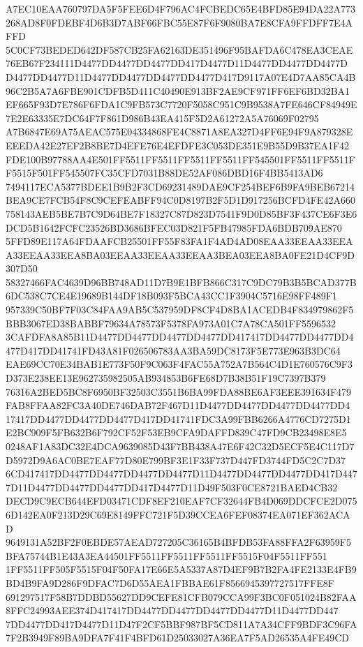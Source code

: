\documentclass[UTF8,fontset=fandol,zihao=-4,a4paper]{ctexart}
\begin{document}
{{A7EC10EAA760797DA5F5FEE6D4F796AC4FCBEDC65E4BFD85E94DA22A773268AD8F0FDEBF4D6B3D7ABF66FBC55E87F6F9080BA7E8CFA9FFDFF7E4AFFD
5C0CF73BEDED642DF587CB25FA62163DE351496F95BAFDA6C478EA3CEAE76EB67F234111D4477DD4477DD4477DD417D4477D11D4477DD4477DD4477D
D4477DD4477D11D4477DD4477DD4477DD4477D417D9117A07E4D7AA85CA4B96C2B5A7A6FBE901CDFB5D411C40490E913BF2AE9CF971FF6EF6BD32BA1
EF665F93D7E786F6FDA1C9FB573C7720F5058C951C9B9538A7FE646CF84949E7E2E63335E7DC64F7F861D986B43EA415F5D2A61272A5A76069F02795
A7B6847E69A75AEAC575E04334868FE4C8871A8EA327D4FF6E94F9A879328EEEEDA42E27EF2B8BE7D4EFE76E4EFDFE3C053DE351E9B55D9B37EA1F42
FDE100B97788AA4E501FF5511FF5511FF5511FF5511FF545501FF5511FF5511FF5515F501FF545507FC35CFD7031B88DE52AF086DBD16F4BB5413AD6
7494117ECA5377BDEE1B9B2F3CD69231489DAE9CF254BEF6B9FA9BEB67214BEA9CE7FCB54F8C9CEFEABFF94C0D8197B2F5D1D917256BCFD4FE42A660
758143AEB5BE7B7C9D64BE7F18327C87D823D7541F9D0D85BF3F437CE6F3E6DCD5B1642FCFC23526BD3686BFEC03D821F5FB47985FDA6BDB709AE870
5FFD89E117A64FDAAFCB25501FF55F83FA1F4AD4AD08EAA33EEAA33EEAA33EEAA33EEA8BA03EEAA33EEAA33EEAA3BEA03EEA8BA0FE21D4CF9D307D50
58327466FAC4639D96BB748AD11D7B9E1BFB866C317C9DC79B3B5BCAD377B6DC538C7CE4E19689B144DF18B093F5BCA43CC1F3904C5716E98FF489F1
957339C50BF7F03C84FAA9AB5C537959DF8CF4D8BA1ACEDB4F834979862F5BBB3067ED38BABBF79634A78573F5378FA973A01C7A78CA501FF5596532
3CAFDFA8A85B11D4477DD4477DD4477DD4477DD417417DD4477DD4477DD4477D417DD41741FD43A81F026506783AA3BA59DC8173F5E773E963B3DC64
EAE69CC70E34BAB1E773F50F9C063F4FAC55A752A7B564C4D1E760576C9F3D373E238EE13E962735982505AB934853B6FE68D7B38B51F19C7397B379
76316A2BED5BC8F6950BF32503C3551B6BA99FDA88BE6AF3EEE391634F479FAB8FFAA82FC3A40DE746DAB72F467D11D4477DD4477DD4477DD4477DD4
17417DD4477DD4477DD4477D417DD41741FDC3A99FBB6266A4776CD7275D1E2BC909F5FB632B6F792CF52F53EB9CFA9DAFFD839C47FD9CB23498E8E5
0248AF1A83DC32E4DCA9639085D43F7BB438A47E6F42C32D5ECF5E4C117D7D5972D9A6AC0BE7EAF77D80E799BF3E1F33F737D447FD3744FD5C2C7D37
6CD417417DD4477DD4477DD4477DD4477D11D4477DD4477DD4477DD417D4477D11D4477DD4477DD4477DD417D4477D11D49F503F0CE8721BAED4CB32
DECD9C9ECB644EFD03471CDF8EF210EAF7CF32644FB4D069DDCFCE2D0756D142EA0F213D29C69E8149FFC721F5D39CCEA6FEF08374EA071EF362ACAD
9649131A52BF2F0EBDE57AEAD727205C36165B4BFDB53FA88FFA2F63959F5BFA75744B1E43A3EA44501FF5511FF5511FF5511FF5515F04F5511FF551
1FF5511FF505F5515F04F50FA17E66E5A5337A87D4EF9B7B2FA4FE2133E4FB9BD4B9FA9D286F9DFAC7D6D55AEA1FBBAE61F8566945397727517FFE8F
691297517F58B7DDBD55627DD9CEFE81CFB079CCA99F3BC0F051024B82FAA8FFC24993AEE374D417417DD4477DD4477DD4477DD4477D11D4477DD447
7DD4477DD417D4477D11D47F2CF5BBF987BF5CD811A7A34CFF9BDF3C96FA7F2B3949F89BA9DFA7F41F4BFD61D25033027A36EA7F5AD26535A4FE49CD
}}
\end{document}
